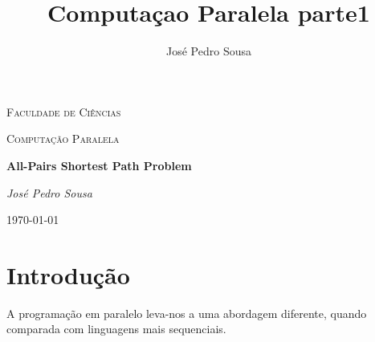 \documentclass[12pt,a4paper]{article}
\author{José Pedro Sousa}
\title{Computaçao Paralela parte1}
\begin{document}
\begin{titlepage}
	\centering
	{\scshape\LARGE Faculdade de Ciências \par}
	\vspace{1cm}
	{\scshape\Large Computação Paralela\par}
	\vspace{1.5cm}
	{\huge\bfseries All-Pairs Shortest Path Problem\par}
	\vspace{2cm}
	{\Large\itshape José Pedro Sousa\par}
	\vfill

	{\large \today\par}
\end{titlepage}
\tableofcontents
\section{Introdução}
A programação em paralelo leva-nos a uma abordagem diferente, quando comparada com linguagens mais sequenciais.



\end{document}
